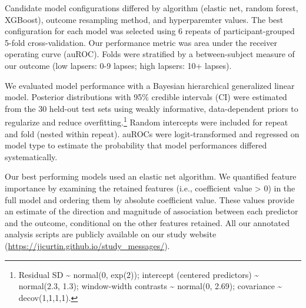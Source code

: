 \documentclass[
  letterpaper,
  DIV=11,
  numbers=noendperiod]{scrartcl}
\begin{document}
Candidate model configurations differed by algorithm (elastic net,
random forest, XGBoost), outcome resampling method, and hyperparemter
values. The best configuration for each model was selected using 6
repeats of participant-grouped 5-fold cross-validation. Our performance
metric was area under the receiver operating curve (auROC). Folds were
stratified by a between-subject measure of our outcome (low lapsers: 0-9
lapses; high lapsers: 10+ lapses).

We evaluated model performance with a Bayesian hierarchical generalized
linear model. Posterior distributions with 95\% credible intervals (CI)
were estimated from the 30 held-out test sets using weakly informative,
data-dependent priors to regularize and reduce overfitting.\footnote{Residual
  SD \textasciitilde{} normal(0, exp(2)); intercept (centered
  predictors) \textasciitilde{} normal(2.3, 1.3); window-width contrasts
  \textasciitilde{} normal(0, 2.69); covariance \textasciitilde{}
  decov(1,1,1,1).} Random intercepts were included for repeat and fold
(nested within repeat). auROCs were logit-transformed and regressed on
model type to estimate the probability that model performances differed
systematically.

Our best performing models used an elastic net algorithm. We quantified
feature importance by examining the retained features (i.e., coefficient
value \textgreater{} 0) in the full model and ordering them by absolute
coefficient value. These values provide an estimate of the direction and
magnitude of association between each predictor and the outcome,
conditional on the other features retained. All our annotated analysis
scripts are publicly available on our study website
(\url{https://jjcurtin.github.io/study_messages/}).
\end{document}
